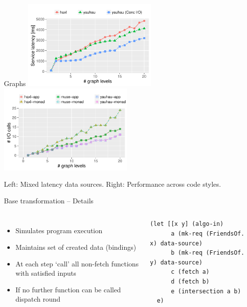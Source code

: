 \documentclass[utf8x,10pt,aspectratio=169]{beamer}
\begin{document}
\begin{frame}{Graphs}
	\includegraphics[width=0.5\textwidth]{plots/io-imbalance}
	\includegraphics[width=0.5\textwidth]{plots/monad-vs-applicative}
	
	Left: Mixed latency data sources. Right: Performance across code styles.
\end{frame}

\begin{frame}[fragile]{Base transformation -- Details}
	\begin{columns}
		\begin{itemize}
			\item Simulates program execution
			\item Maintains set of created data (bindings)
			\item At each step `call' all non-fetch functions with satisfied inputs
			\item If no further function can be called dispatch round
		\end{itemize}
		\begin{verbatim}
(let [[x y] (algo-in)
      a (mk-req (FriendsOf. x) data-source)
      b (mk-req (FriendsOf. y) data-source)
      c (fetch a)
      d (fetch b)
      e (intersection a b)
  e)
		\end{verbatim}
	\end{columns}

\end{frame}
\end{document}
